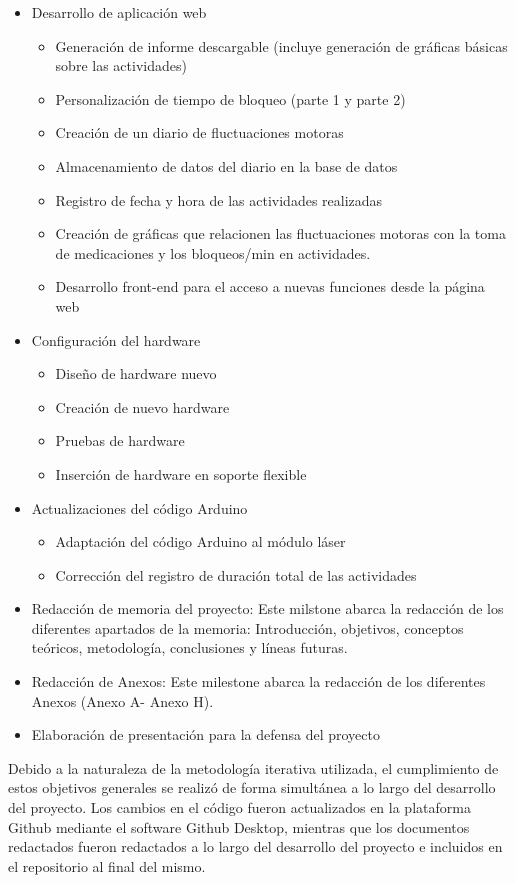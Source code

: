 \begin{itemize}
    \item Desarrollo de aplicación web
    \begin{itemize}
        \item Generación de informe descargable (incluye generación de gráficas básicas sobre las actividades)
        \item Personalización de tiempo de bloqueo (parte 1 y parte 2)
        \item Creación de un diario de fluctuaciones motoras
        \item Almacenamiento de datos del diario en la base de datos
        \item Registro de fecha y hora de las actividades realizadas
        \item Creación de gráficas que relacionen las fluctuaciones motoras con la toma de medicaciones y los bloqueos/min en actividades.
        \item Desarrollo front-end para el acceso a nuevas funciones desde la página web
    \end{itemize}
    \item Configuración del hardware
    \begin{itemize}
        \item Diseño de hardware nuevo
        \item Creación de nuevo hardware
        \item Pruebas de hardware
        \item Inserción de hardware en soporte flexible
    \end{itemize}
    \item Actualizaciones del código Arduino
    \begin{itemize}
        \item Adaptación del código Arduino al módulo láser
        \item Corrección del registro de duración total de las actividades
    \end{itemize}
    \item Redacción de memoria del proyecto: Este milstone abarca la redacción de los diferentes apartados de la memoria: Introducción, objetivos, conceptos teóricos, metodología, conclusiones y líneas futuras.
    \item Redacción de Anexos: Este milestone abarca la redacción de los diferentes Anexos (Anexo A- Anexo H).
    \item Elaboración de presentación para la defensa del proyecto
\end{itemize}
Debido a la naturaleza de la metodología iterativa utilizada, el cumplimiento de estos objetivos generales se realizó de forma simultánea a lo largo del desarrollo del proyecto. Los cambios en el código fueron actualizados en la plataforma Github mediante el software Github Desktop, mientras que los documentos redactados fueron redactados a lo largo del desarrollo del proyecto e incluidos en el repositorio al final del mismo.


